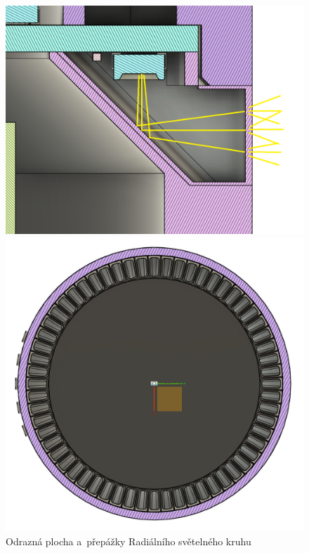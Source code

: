 \begin{figure}[h!]
    \begin{minipage}{0.5\textwidth}
        \centering
        \includegraphics[width=\textwidth]{text/PraktickaCast/img/AHS-odrazkaRozptylka.png}
    \end{minipage}
    \begin{minipage}{0.5\textwidth}
        \centering
        \includegraphics[width=\textwidth]{text/PraktickaCast/img/AHS-prepazky.png}
    \end{minipage}
    \caption{Odrazná plocha a~přepážky Radiálního světelného kruhu}
    \label{fig:AHS-radializatoru}
\end{figure}

